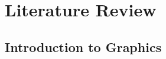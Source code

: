 \documentclass[print]{nuthesis}
\begin{document}




\tableofcontents

\listoffigures
\listoftables

\mainmatter


\hypertarget{literature-review}{%
\chapter{Literature Review}\label{literature-review}}

\hypertarget{introduction-to-graphics}{%
\section{Introduction to Graphics}\label{introduction-to-graphics}}
\end{document}
